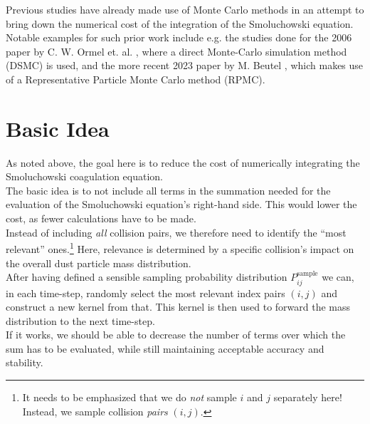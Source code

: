     Previous studies have already made use of Monte Carlo methods in an attempt to 
    bring down the numerical cost of the integration of the Smoluchowski equation. \\

    Notable examples for such prior work include e.g. the studies done for the 
    2006 paper by C. W. Ormel et. al. \cite{ormel_2006}, where a 
    direct Monte-Carlo simulation method (DSMC) is used, and 
    the more recent 2023 paper by M. Beutel \cite{beutel_2023},
    which makes use of a Representative Particle Monte Carlo method (RPMC). \\


\section{Basic Idea}

    As noted above, the goal here is to reduce the cost of numerically integrating the 
    Smoluchowski coagulation equation. \\

    The basic idea is to not include all terms in the summation needed for the evaluation 
    of the Smoluchowski equation's right-hand side. This would lower the cost, as fewer 
    calculations have to be made. \\

    Instead of including \textit{all} collision pairs, we therefore need to identify the ``most 
    relevant'' ones.\footnote{
        It needs to be emphasized that we do \textit{not} sample $i$ and $j$ separately here! 
        Instead, we sample collision \textit{pairs} $(i, j)$.
    }
    Here, relevance is determined by a specific collision's impact on the overall 
    dust particle mass distribution. \\

    After having defined a sensible sampling probability distribution           
    $P_{ij}^\text{sample}$ we can, in each time-step, randomly select the most relevant 
    index pairs $(i, j)$ and construct a new kernel from that.
    This kernel is then used to forward the mass distribution to the next time-step. \\

    If it works, we should be able to decrease the number of terms over which the sum has
    to be evaluated, while still maintaining acceptable accuracy and stability.

